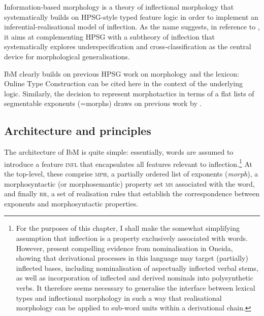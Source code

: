 \documentclass[output=paper
 	        ,biblatex
                ,babelshorthands
                ,newtxmath
                ,draftmode
                ,colorlinks, citecolor=brown
]{langscibook}
\begin{document}
\begin{exe}
\begin{xlist}
Information-based morphology \citep{Crysmann:Bonami:2016} is a theory
of inflectional morphology that systematically builds on HPSG-style
typed feature logic in order to implement an inferential-realisational
model of inflection. As the name suggests, in reference to
\citet{Pollard87}, it aims at complementing HPSG with a 
subtheory of inflection that systematically 
explores underspecification and cross-classification as the central
device for morphological generalisations.

IbM clearly builds on previous HPSG work on morphology and the
lexicon: Online Type Construction \citep{Koenig94} can be cited here
in the context of the underlying logic. Similarly, the decision to
represent morphotactics in terms of a flat lists of segmentable
exponents (=morphs) draws on previous work by
\citet{crysmann_b03book}. 


\subsection{Architecture and principles}

The architecture of IbM is quite simple: essentially, words are
assumed to introduce a feature \textsc{infl} that encapsulates all
features relevant to inflection.\footnote{For the purposes of this
  chapter, I shall make the somewhat simplifying assumption that
  inflection is a property exclusively associated with words. However,
  \citet{Koenig:Michelson:2020} present compelling evidence from
  nominalisation in Oneida, showing that derivational processes in
  this language may target (partially) inflected bases, including
  nominalisation of aspectually inflected verbal stems, as well as
  incorporation of inflected and derived nominals into polysynthetic
  verbs. It therefore seems necessary to generalise the interface
  between lexical types and inflectional morphology in such a way that
realisational morphology can be applied to sub-word units within a
derivational chain. } At the top-level, these comprise \textsc{mph}, a partially
ordered list of exponents (\textit{morph}), a morphosyntactic (or
morphosemantic) property set \textsc{ms} associated with the word, and
finally \textsc{rr}, a set of realisation rules that establish the
correspondence between exponents and morphosyntactic properties.

\begin{exe}
  \ex
{}


\end{exe}
\end{xlist}
\end{exe}
\end{document}
